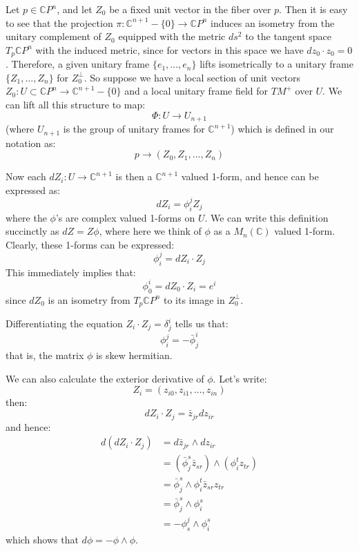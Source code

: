 \documentclass[11pt]{amsart}
\theoremstyle{definition}
\def \CP{ \mathbb{C}P }
\def \C{ \mathbb{C} }
\begin{document}
Let $p \in \CP^{n}$, and let $Z_0$ be a fixed unit vector in the fiber over $p$.  Then it is easy to see that the projection $\pi : \C^{n+1} - \{0\} \rightarrow \CP^{n}$ induces an isometry from the unitary complement of $Z_0$ equipped with the metric $ds^2$ to the tangent space $T_p \CP^{n}$ with the induced metric, since for vectors in this space we have $ d z_0 \cdot z_0 = 0 $.  Therefore, a given unitary frame $ \{ e_1, \ldots, e_n \}$ lifts isometrically to a unitary frame $ \{ Z_1, \ldots, Z_n \} $ for $Z_0^{\perp}$.  So suppose we have a local section of unit vectors $Z_0 : U \subset \CP^{n} \rightarrow  \C^{n+1} - \{0\}$ and a local unitary frame field for $TM^{+}$ over $U$.  We can lift all this structure to map:
%
$$ \Phi : U \rightarrow U_{n+1} $$
% 
(where $U_{n+1}$ is the group of unitary frames for $\C^{n+1}$) which is defined in our notation as:
%
$$ p \rightarrow (Z_0, Z_1, \ldots, Z_n) $$

Now each $d Z_i : U \rightarrow \C^{n+1}$ is then a $\C^{n+1}$ valued 1-form, and hence can be expressed as:
%
$$ d Z_i = \phi^j_i Z_j $$
%
where the $\phi$'s are complex valued 1-forms on $U$.  We can write this definition succinctly as $ d Z = Z \phi$, where here we think of $\phi$ as a $M_{n}( \C )$ valued 1-form.  Clearly, these 1-forms can be expressed:
%
$$ \phi^j_i = d Z_i \cdot Z_j $$
%
This immediately implies that:
%
$$ \phi^i_0 = d Z_0 \cdot Z_i = e^i $$
%
since $d Z_0$ is an isometry from $T_p \CP^n$ to its image in $Z_0^{\perp}$.

Differentiating the equation $ Z_i \cdot Z_j = \delta^i_j $ tells us that:
%
$$ \phi^j_i = - \bar{\phi}^i_j $$
%
that is, the matrix $\phi$ is skew hermitian. 

We can also calculate the exterior derivative of $\phi$.  Let's write:
%
$$ Z_i = ( z_{i0}, z_{i1}, \ldots, z_{in} ) $$
%
then:
%
$$ d Z_i \cdot Z_j = \bar{z}_{jr} d z_{ir} $$
%
and hence:
%
\begin{align*}
d( d Z_i \cdot Z_j ) &= d \bar{z}_{jr} \wedge d z_{ir} \\
&= ( \bar{\phi}^s_j \bar{z}_{sr} ) \wedge ( \phi^t_i z_{tr} ) \\
&= \bar{\phi}^s_j \wedge \phi^t_i \bar{z}_{sr}  z_{tr} \\
&= \bar{\phi}^s_j \wedge \phi^s_i \\
&= - \phi^j_s \wedge \phi^s_i
\end{align*}
%
which shows that $d \phi = - \phi \wedge \phi $.   
\end{document}
